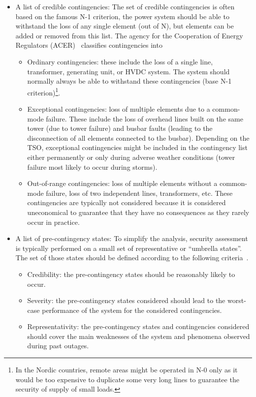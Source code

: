 \begin{itemize}
    \item A list of credible contingencies: The set of credible contingencies is often based on the famous N-1 criterion, \ie the power system should be able to withstand the loss of any single element (out of N), but elements can be added or removed from this list. The agency for the Cooperation of Energy Regulators (ACER)~\cite{ACER_CSAM} classifies contingencies into
    \begin{itemize}
        \item Ordinary contingencies: these include the loss of a single line, transformer, generating unit, or HVDC system. The system should normally always be able to withstand these contingencies (base N-1 criterion)\footnote{In the Nordic countries, remote areas might be operated in N-0 only as it would be too expensive to duplicate some very long lines to guarantee the security of supply of small loads.}.
        \item Exceptional contingencies: loss of multiple elements due to a common-mode failure. These include the loss of overhead lines built on the same tower (due to tower failure) and busbar faults (leading to the disconnection of all elements connected to the busbar). Depending on the TSO, exceptional contingencies might be included in the contingency list either permanently or only during adverse weather conditions (\eg tower failure most likely to occur during storms).
        \item Out-of-range contingencies: loss of multiple elements without a common-mode failure, \eg loss of two independent lines, transformers, etc. These contingencies are typically not considered because it is considered uneconomical to guarantee that they have no consequences as they rarely occur in practice.
    \end{itemize}
    \item A list of pre-contingency states: To simplify the analysis, security assessment is typically performed on a small set of representative or ``umbrella states''. The set of those states should be defined according to the following criteria~\cite{CIGREreviewOfTools}.
    \begin{itemize}
        \item Credibility: the pre-contingency states should be reasonably likely to occur.
        \item Severity: the pre-contingency states considered should lead to the worst-case performance of the system for the considered contingencies.
        \item Representativity: the pre-contingency states and contingencies considered should cover the main weaknesses of the system and phenomena observed during past outages.

\end{itemize}
\end{itemize}
